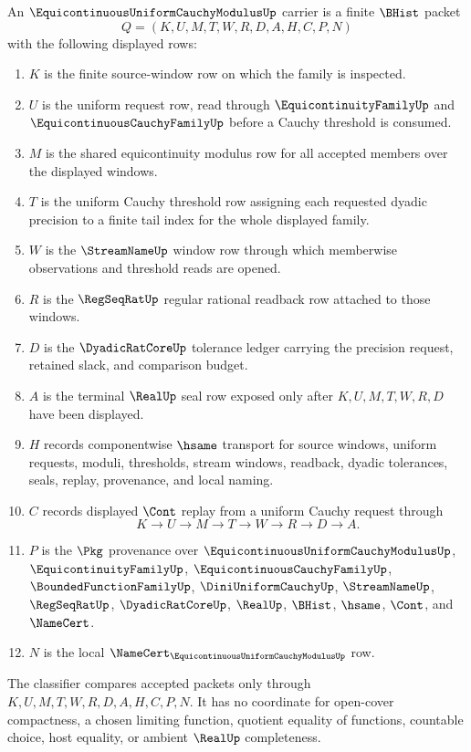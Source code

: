 \begin{definition}
\label{def:equicontinuous-uniform-cauchy-modulus-carrier}
An $\EquicontinuousUniformCauchyModulusUp$ carrier is a finite $\BHist$ packet
$$
Q=(K,U,M,T,W,R,D,A,H,C,P,N)
$$
with the following displayed rows:
\begin{enumerate}
\item $K$ is the finite source-window row on which the family is inspected.
\item $U$ is the uniform request row, read through $\EquicontinuityFamilyUp$ and $\EquicontinuousCauchyFamilyUp$ before a Cauchy threshold is consumed.
\item $M$ is the shared equicontinuity modulus row for all accepted members over the displayed windows.
\item $T$ is the uniform Cauchy threshold row assigning each requested dyadic precision to a finite tail index for the whole displayed family.
\item $W$ is the $\StreamNameUp$ window row through which memberwise observations and threshold reads are opened.
\item $R$ is the $\RegSeqRatUp$ regular rational readback row attached to those windows.
\item $D$ is the $\DyadicRatCoreUp$ tolerance ledger carrying the precision request, retained slack, and comparison budget.
\item $A$ is the terminal $\RealUp$ seal row exposed only after $K,U,M,T,W,R,D$ have been displayed.
\item $H$ records componentwise $\hsame$ transport for source windows, uniform requests, moduli, thresholds, stream windows, readback, dyadic tolerances, seals, replay, provenance, and local naming.
\item $C$ records displayed $\Cont$ replay from a uniform Cauchy request through
$$
K\longrightarrow U\longrightarrow M\longrightarrow T\longrightarrow W\longrightarrow R\longrightarrow D\longrightarrow A .
$$
\item $P$ is the $\Pkg$ provenance over $\EquicontinuousUniformCauchyModulusUp$, $\EquicontinuityFamilyUp$, $\EquicontinuousCauchyFamilyUp$, $\BoundedFunctionFamilyUp$, $\DiniUniformCauchyUp$, $\StreamNameUp$, $\RegSeqRatUp$, $\DyadicRatCoreUp$, $\RealUp$, $\BHist$, $\hsame$, $\Cont$, and $\NameCert$.
\item $N$ is the local $\NameCert_{\EquicontinuousUniformCauchyModulusUp}$ row.
\end{enumerate}
The classifier compares accepted packets only through $K,U,M,T,W,R,D,A,H,C,P,N$. It has no coordinate for open-cover compactness, a chosen limiting function, quotient equality of functions, countable choice, host equality, or ambient $\RealUp$ completeness.
\end{definition}

